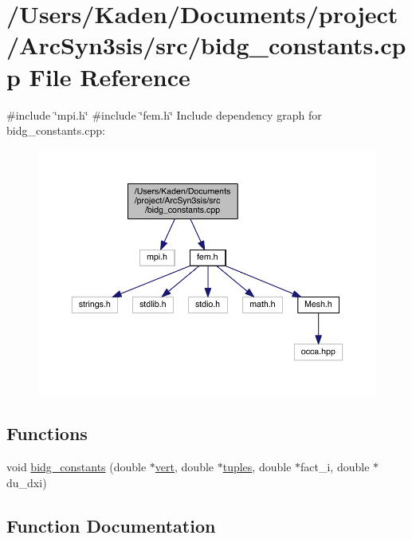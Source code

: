 \hypertarget{a00572}{}\section{/\+Users/\+Kaden/\+Documents/project/\+Arc\+Syn3sis/src/bidg\+\_\+constants.cpp File Reference}
\label{a00572}
{\ttfamily \#include \char`\"{}mpi.\+h\char`\"{}}\newline
{\ttfamily \#include \char`\"{}fem.\+h\char`\"{}}\newline
Include dependency graph for bidg\+\_\+constants.\+cpp\+:\nopagebreak
\begin{figure}[H]
\begin{center}
\leavevmode
\includegraphics[width=350pt]{a00573}
\end{center}
\end{figure}
\subsection*{Functions}
\begin{DoxyCompactItemize}
\item 
void \hyperlink{a00572_a45390a77c9093b8b1144623da67508c8}{bidg\+\_\+constants} (double $\ast$\hyperlink{a00605_a15bccd83c1e570e4a0ff17c42152989b}{vert}, double $\ast$\hyperlink{a00605_ae906280b3cb956d2555d33b882cca5bf}{tuples}, double $\ast$fact\+\_\+i, double $\ast$du\+\_\+dxi)
\end{DoxyCompactItemize}


\subsection{Function Documentation}
\mbox{\label{a00572_a45390a77c9093b8b1144623da67508c8}} 
